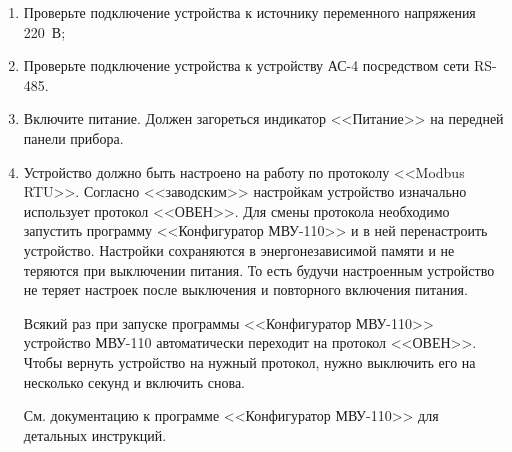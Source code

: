 \begin{enumerate}

\item Проверьте подключение устройства к источнику переменного напряжения 220~В;

\item Проверьте подключение устройства к устройству АС-4 посредством сети RS-485.

\item Включите питание. Должен загореться индикатор <<Питание>> на передней панели прибора.

\item Устройство должно быть настроено на работу по протоколу <<Modbus RTU>>. Согласно <<заводским>> настройкам устройство изначально использует протокол <<ОВЕН>>. Для смены протокола необходимо запустить программу <<Конфигуратор МВУ-110>> и в ней перенастроить устройство. Настройки сохраняются в энергонезависимой памяти и не теряются при выключении питания. То есть будучи настроенным устройство не теряет настроек после выключения и повторного включения питания.

\IMPORTANT Всякий раз при запуске программы <<Конфигуратор МВУ-110>> устройство МВУ-110 автоматически переходит на протокол <<ОВЕН>>. Чтобы вернуть устройство на нужный протокол, нужно выключить его на несколько секунд и включить снова.

См. документацию к программе <<Конфигуратор МВУ-110>> для детальных инструкций.

\end{enumerate}
